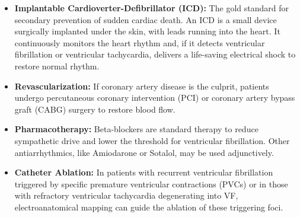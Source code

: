\begin{itemize}
    \item \textbf{Implantable Cardioverter-Defibrillator (ICD):} The gold standard for secondary prevention of sudden cardiac death. An ICD is a small device surgically implanted under the skin, with leads running into the heart. It continuously monitors the heart rhythm and, if it detects ventricular fibrillation or ventricular tachycardia, delivers a life-saving electrical shock to restore normal rhythm.
    \item \textbf{Revascularization:} If coronary artery disease is the culprit, patients undergo percutaneous coronary intervention (PCI) or coronary artery bypass graft (CABG) surgery to restore blood flow.
    \item \textbf{Pharmacotherapy:} Beta-blockers are standard therapy to reduce sympathetic drive and lower the threshold for ventricular fibrillation. Other antiarrhythmics, like Amiodarone or Sotalol, may be used adjunctively.
    \item \textbf{Catheter Ablation:} In patients with recurrent ventricular fibrillation triggered by specific premature ventricular contractions (PVCs) or in those with refractory ventricular tachycardia degenerating into VF, electroanatomical mapping can guide the ablation of these triggering foci.
\end{itemize}

